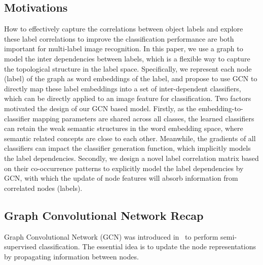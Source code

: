 \documentclass[10pt,twocolumn,letterpaper]{article}
\begin{document}
\subsection{Motivations}\label{sec:motivation}

How to effectively capture the correlations between object labels and explore these label correlations to improve the classification performance are both important for multi-label image recognition. In this paper, we use a graph to model the inter dependencies between labels, which is a flexible way to capture the topological structure in the label space. Specifically, we represent each node (label) of the graph as word embeddings of the label, and propose to use GCN to directly map these label embeddings into a set of inter-dependent classifiers, which can be directly applied to an image feature for classification. Two factors motivated the design of our GCN based model. Firstly, as the embedding-to-classifier mapping parameters are shared across all classes, the learned classifiers can retain the weak semantic structures in the word embedding space, where semantic related concepts are close to each other. Meanwhile, the gradients of all classifiers can impact the classifier generation function, which implicitly models the label dependencies. Secondly,  we design a novel label correlation matrix based on their co-occurrence patterns to explicitly model the label dependencies by GCN, with which the update of node features will absorb information from correlated nodes (labels). 



\subsection{Graph Convolutional Network Recap}

Graph Convolutional Network (GCN) was introduced in~\cite{gcn} to perform semi-supervised classification. The essential idea is to update the node representations by propagating information between nodes.
\end{document}
